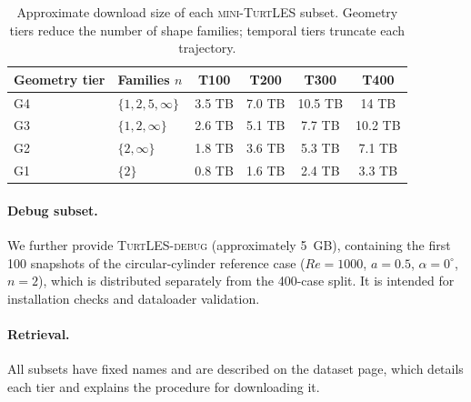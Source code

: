 \documentclass{article}
\begin{document}
{\begin{table}[t]
  \centering
  \color{revcolor}
  \caption{Approximate download size of each \textsc{mini-TurtLES} subset. Geometry tiers
  reduce the number of shape families; temporal tiers truncate each trajectory.}
  \label{tab:minitiers}
  \small
  \begin{tabular}{llcccc}
    \toprule
    Geometry tier & Families $n$ & T100 & T200 & T300 & T400 \\
    \midrule
    G4 & $\{1, 2, 5, \infty\}$ & 3.5 TB & 7.0 TB & 10.5 TB & 14 TB \\
    G3 & $\{1, 2, \infty\}$    & 2.6 TB & 5.1 TB & 7.7 TB & 10.2 TB \\
    G2 & $\{2, \infty\}$       & 1.8 TB & 3.6 TB & 5.3 TB & 7.1 TB \\
    G1 & $\{2\}$               & 0.8 TB & 1.6 TB & 2.4 TB & 3.3 TB \\
    \bottomrule
  \end{tabular}
\end{table}

\paragraph{Debug subset.}
We further provide \textsc{TurtLES-debug} (approximately 5~GB), containing the first 100 snapshots of the circular-cylinder reference case ($Re = 1000$, $a = 0.5$, $\alpha = 0^\circ$, $n = 2$), which is distributed separately from the 400-case split. It is intended for installation checks and dataloader validation.

\paragraph{Retrieval.}
All subsets have fixed names and are described on the dataset page, which details each tier and explains the procedure for downloading it.}

\end{document}
